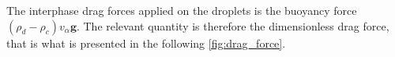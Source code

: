 The interphase drag forces applied on the droplets is the buoyancy force $(\rho_d-\rho_c)v_\alpha \textbf{g}$.
The relevant quantity is therefore the dimensionless drag force, that is what is presented in the following \ref{fig:drag_force}. 



